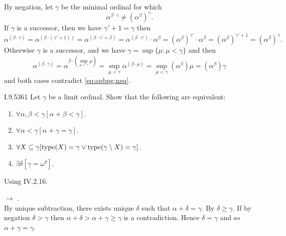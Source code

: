 By negation, let \(\gamma\) be the minimal ordinal for which
\begin{equation} \label{eq:apbpg:neq}
\alpha^{\beta\cdot\gamma} \neq  \left(\alpha^\beta\right)^\gamma.
\end{equation}
If \(\gamma\) is a successor, then we have \(\gamma'+1=\gamma\)
then
\begin{equation*}
\alpha^{(\beta\cdot\gamma)}
= \alpha^{(\beta\cdot(\gamma'+1))}
= \alpha^{(\beta\cdot\gamma'+\beta)}
= \alpha^{(\beta\cdot\gamma')}\cdot\alpha^\beta
= \left(\alpha^\beta\right)^{\gamma'}\cdot\alpha^\beta
= \left(\alpha^\beta\right)^{\gamma'+1}
= \left(\alpha^\beta\right)^\gamma.
\end{equation*}
Otherwise \(\gamma\) is a successor,
and we have \(\gamma = \sup\{\mu: \mu<\gamma\}\) and then
\begin{equation*}
\alpha^{(\beta\cdot\gamma)}
= \alpha^{\beta\cdot(\sup_{\mu<\gamma}\mu)}
= \sup_{\mu<\gamma}\alpha^{(\beta\cdot\mu)}
= \sup_{\mu<\gamma}\left(\alpha^\beta\right)\mu
= \left(\alpha^\beta\right)\gamma
\end{equation*}
and both cases contradict \eqref{eq:apbpg:neq}.

\begin{lexcopy}{I.9.53}{61} 
Let \(\gamma\) be a limit ordinal. Show that the following are 
equivalent:
\begin{enumerate}
\renewcommand{\theenumi}{\alph{enumi}}
\item
\(\forall \alpha,\beta < \gamma [\alpha + \beta < \gamma]\).

\item
\(\forall \alpha < \gamma [ \alpha + \gamma = \gamma]\).

\item
\(\forall X \subseteq \gamma
  [\mathop{\mathrm{type}}(X) = \gamma \lor \mathop{\mathrm{type}}(\gamma\setminus X) = \gamma]\).

\item
\(\exists\delta[\gamma = \omega^\delta]\).
\end{enumerate}
\end{lexcopy}

Using \cite{Levy2002Basic} IV.2.16.

 \(\rightarrow\) .\\
By unique subtraction, there exists unique \(\delta\) such  that
\(\alpha + \delta = \gamma\). By  \(\delta \geq \gamma\).
If by negation \(\delta > \gamma\)
then \(\alpha + \delta > \alpha + \gamma \geq \gamma\)
is a contradiction. Hence \(\delta = \gamma\) and so
\(\alpha + \gamma = \gamma\).

